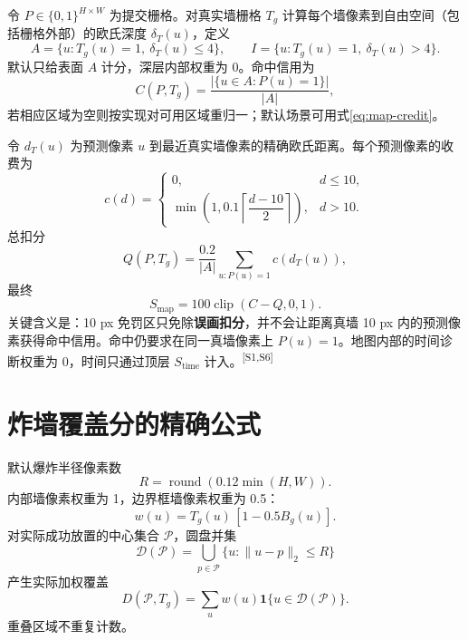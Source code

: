 \documentclass[UTF8,11pt]{ctexart}
\newcommand{\src}[1]{\textsuperscript{\textcolor{blue!65!black}{[#1]}}}
\newcommand{\clip}{\operatorname{clip}}
\newcommand{\one}{\mathbf{1}}
\begin{document}
令 $P\in\{0,1\}^{H\times W}$ 为提交栅格。对真实墙栅格 $T_g$ 计算每个墙像素到自由空间（包括栅格外部）的欧氏深度 $\delta_T(u)$，定义
\begin{equation}
A=\{u:T_g(u)=1,\ \delta_T(u)\le4\},\qquad
I=\{u:T_g(u)=1,\ \delta_T(u)>4\}.
\end{equation}
默认只给表面 $A$ 计分，深层内部权重为 0。命中信用为
\begin{equation}
C(P,T_g)=\frac{|\{u\in A:P(u)=1\}|}{|A|},
\label{eq:map-credit}
\end{equation}
若相应区域为空则按实现对可用区域重归一；默认场景可用式\eqref{eq:map-credit}。

令 $d_T(u)$ 为预测像素 $u$ 到最近真实墙像素的精确欧氏距离。每个预测像素的收费为
\begin{equation}
c(d)=
\begin{cases}
0,&d\le10,\\
\min\left(1,0.1\left\lceil\dfrac{d-10}{2}\right\rceil\right),&d>10.
\end{cases}
\end{equation}
总扣分
\begin{equation}
Q(P,T_g)=\frac{0.2}{|A|}\sum_{u:P(u)=1}c(d_T(u)),
\end{equation}
最终
\begin{equation}
S_{\mathrm{map}}=100\clip(C-Q,0,1).
\label{eq:map-score}
\end{equation}
关键含义是：10 px 免罚区只免除\textbf{误画扣分}，并不会让距离真墙 10 px 内的预测像素获得命中信用。命中仍要求在同一真墙像素上 $P(u)=1$。地图内部的时间诊断权重为 0，时间只通过顶层 $S_{\mathrm{time}}$ 计入。\src{S1,S6}

\section{炸墙覆盖分的精确公式}

默认爆炸半径像素数
\begin{equation}
R=\operatorname{round}(0.12\min(H,W)).
\end{equation}
内部墙像素权重为 1，边界框墙像素权重为 0.5：
\begin{equation}
w(u)=T_g(u)\,[1-0.5B_g(u)].
\end{equation}
对实际成功放置的中心集合 $\mathcal P$，圆盘并集
\begin{equation}
\mathcal D(\mathcal P)=\bigcup_{p\in\mathcal P}\{u:\|u-p\|_2\le R\}
\end{equation}
产生实际加权覆盖
\begin{equation}
D(\mathcal P,T_g)=\sum_u w(u)\one\{u\in\mathcal D(\mathcal P)\}.
\end{equation}
重叠区域不重复计数。
\end{document}
